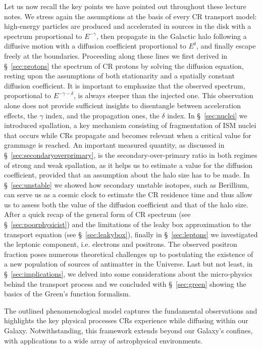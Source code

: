 Let us now recall the key points we have pointed out throughout these lecture notes. We stress again the assumptions at the basis of every CR transport model: high-energy particles are produced and accelerated in sources in the disk with a spectrum proportional to $E^{-\gamma}$, then propagate in the Galactic halo following a diffusive motion with a diffusion coefficient proportional to $E^{\delta}$, and finally escape freely at the boundaries. Proceeding along these lines we first derived in \S~\ref{sec:protons} the spectrum of CR protons by solving the diffusion equation, resting upon the assumptions of both stationarity and a spatially constant diffusion coefficient. It is important to emphasize that the observed spectrum, proportional to $E^{-\gamma-\delta}$, is always steeper than the injected one. This observation alone does not provide sufficient insights to disentangle between acceleration effects, the $\gamma$ index, and the propagation ones, the $\delta$ index. In \S~\ref{sec:nuclei} we introduced spallation, a key mechanism consisting of fragmentation of ISM nuclei that occurs while CRs propagate and becomes relevant when a critical value for grammage is reached. An important measured quantity, as discussed in \S~\ref{sec:secondaryoverprimary}, is the secondary-over-primary ratio in both regimes of strong and weak spallation, as it helps us to estimate a value for the diffusion coefficient, provided that an assumption about the halo size has to be made. In \S~\ref{sec:unstable} we showed how secondary unstable isotopes, such as Berillium, can serve us as a cosmic clock to estimate the CR residence time and thus allow us to assess both the value of the diffusion coefficient and that of the halo size. After a quick recap of the general form of CR spectrum (see \S~\ref{sec:poorphysicist}) and the limitations of the leaky box approximation to the transport equation (see \S~\ref{sec:leakybox}), finally in \S~\ref{sec:leptons} we investigated the leptonic component, i.e. electrons and positrons. The observed positron fraction poses numerous theoretical challenges up to postulating the existence of a new population of sources of antimatter in the Universe. Last but not least, in \S~\ref{sec:implications}, we delved into some considerations about the micro-physics behind the transport process and we concluded with \S~\ref{sec:green} showing the basics of the Green's function formalism.

The outlined phenomenological model captures the fundamental observations and highlights the key physical processes CRs experience while diffusing within our Galaxy. Notwithstanding, this framework extends beyond our Galaxy's confines, with applications to a wide array of astrophysical environments.
